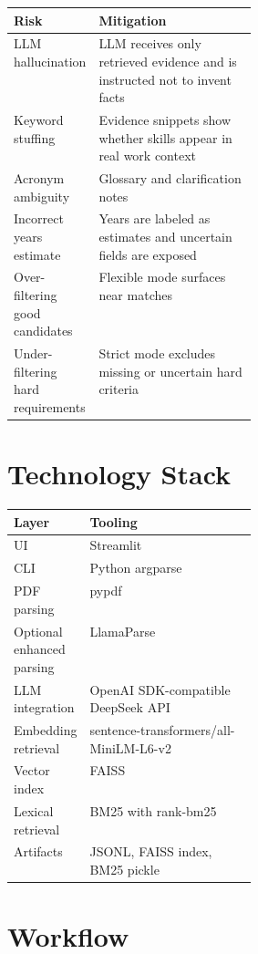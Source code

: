 \documentclass[11pt]{article}
\begin{document}
\begin{center}
\begin{tabularx}{\linewidth}{|p{0.31\linewidth}|Y|}
\hline
\textbf{Risk} & \textbf{Mitigation} \\
\hline
LLM hallucination & LLM receives only retrieved evidence and is instructed not to invent facts \\
\hline
Keyword stuffing & Evidence snippets show whether skills appear in real work context \\
\hline
Acronym ambiguity & Glossary and clarification notes \\
\hline
Incorrect years estimate & Years are labeled as estimates and uncertain fields are exposed \\
\hline
Over-filtering good candidates & Flexible mode surfaces near matches \\
\hline
Under-filtering hard requirements & Strict mode excludes missing or uncertain hard criteria \\
\hline
\end{tabularx}
\end{center}

\section{Technology Stack}

\begin{center}
\begin{tabularx}{\linewidth}{|p{0.31\linewidth}|Y|}
\hline
\textbf{Layer} & \textbf{Tooling} \\
\hline
UI & Streamlit \\
\hline
CLI & Python argparse \\
\hline
PDF parsing & pypdf \\
\hline
Optional enhanced parsing & LlamaParse \\
\hline
LLM integration & OpenAI SDK-compatible DeepSeek API \\
\hline
Embedding retrieval & sentence-transformers/all-MiniLM-L6-v2 \\
\hline
Vector index & FAISS \\
\hline
Lexical retrieval & BM25 with rank-bm25 \\
\hline
Artifacts & JSONL, FAISS index, BM25 pickle \\
\hline
\end{tabularx}
\end{center}

\section{Workflow}
\end{document}
